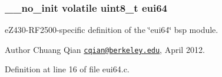 \subsubsection[{\texorpdfstring{eui64}{eui64}}]{\setlength{\rightskip}{0pt plus 5cm}\+\_\+\+\_\+no\+\_\+init volatile {\bf uint8\+\_\+t} eui64}\hypertarget{ez430-rf2500_2eui64_8c_a574bc0e8cd65bb0a8c6d40826901ba4e}{}\label{ez430-rf2500_2eui64_8c_a574bc0e8cd65bb0a8c6d40826901ba4e}


e\+Z430-\/\+R\+F2500-\/specific definition of the \char`\"{}eui64\char`\"{} bsp module. 

\begin{DoxyAuthor}{Author}
Chuang Qian \href{mailto:cqian@berkeley.edu}{\tt cqian@berkeley.\+edu}, April 2012. 
\end{DoxyAuthor}


Definition at line 16 of file eui64.\+c.

